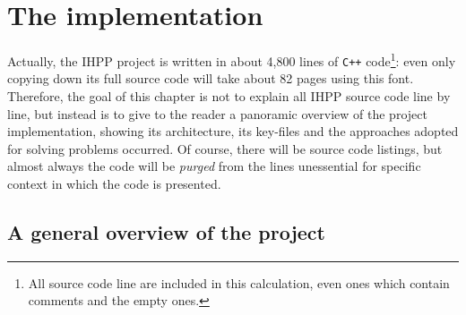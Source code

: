\documentclass[a4paper,10pt]{report}
\begin{document}
\chapter{The implementation}

Actually, the IHPP project is written in about 4,800 lines of \verb|C++| 
code\footnote{All source code line are included in this calculation, even ones which 
contain comments and the empty ones.}: 
even only copying down its full source code will take about 82 pages using
this font. Therefore, the goal of this chapter is not to explain 
all IHPP source code line by line, but instead is to give to the reader 
a panoramic overview of the project implementation, showing its architecture, 
its key-files and the approaches adopted for solving problems occurred.
Of course, there will be source code listings, but almost always the code will be
\emph{purged} from the lines unessential for specific context in which the code is presented.

\section{A general overview of the project}
\end{document}
